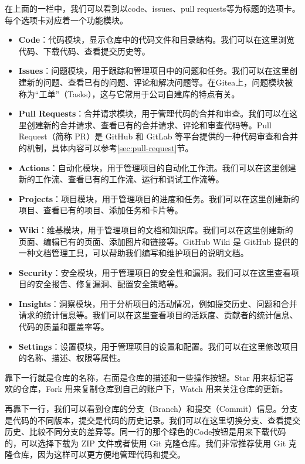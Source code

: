 \documentclass[../main.tex]{subfiles}
\begin{document}
在上面的一栏中，我们可以看到以code、issues、pull requests等为标题的选项卡。每个选项卡对应着一个功能模块。

\begin{itemize}
  \item \textbf{Code}：代码模块，显示仓库中的代码文件和目录结构。我们可以在这里浏览代码、下载代码、查看提交历史等。
  \item \textbf{Issues}：问题模块，用于跟踪和管理项目中的问题和任务。我们可以在这里创建新的问题、查看已有的问题、评论和解决问题等。在Gitea上，问题模块被称为“工单”（Tasks），这与它常用于公司自建库的特点有关。
  \item \textbf{Pull Requests}：合并请求模块，用于管理代码的合并和审查。我们可以在这里创建新的合并请求、查看已有的合并请求、评论和审查代码等。Pull Request（简称 PR）是 GitHub 和 GitLab 等平台提供的一种代码审查和合并的机制，具体内容可以参考\ref{sec:pull-request}节。
  \item \textbf{Actions}：自动化模块，用于管理项目的自动化工作流。我们可以在这里创建新的工作流、查看已有的工作流、运行和调试工作流等。
  \item \textbf{Projects}：项目模块，用于管理项目的进度和任务。我们可以在这里创建新的项目、查看已有的项目、添加任务和卡片等。
  \item \textbf{Wiki}：维基模块，用于管理项目的文档和知识库。我们可以在这里创建新的页面、编辑已有的页面、添加图片和链接等。GitHub Wiki 是 GitHub 提供的一种文档管理工具，可以帮助我们编写和维护项目的说明文档。
  \item \textbf{Security}：安全模块，用于管理项目的安全性和漏洞。我们可以在这里查看项目的安全报告、修复漏洞、配置安全策略等。
  \item \textbf{Insights}：洞察模块，用于分析项目的活动情况，例如提交历史、问题和合并请求的统计信息等。我们可以在这里查看项目的活跃度、贡献者的统计信息、代码的质量和覆盖率等。
  \item \textbf{Settings}：设置模块，用于管理项目的设置和配置。我们可以在这里修改项目的名称、描述、权限等属性。
\end{itemize}

靠下一行就是仓库的名称，右面是仓库的描述和一些操作按钮。Star 用来标记喜欢的仓库，Fork 用来复制仓库到自己的账户下，Watch 用来关注仓库的更新。

再靠下一行，我们可以看到仓库的分支（Branch）和提交（Commit）信息。分支是代码的不同版本，提交是代码的历史记录。我们可以在这里切换分支、查看提交历史、比较不同分支的差异等。同一行的那个绿色的Code按钮是用来下载代码的，可以选择下载为 ZIP 文件或者使用 Git 克隆仓库。我们非常推荐使用 Git 克隆仓库，因为这样可以更方便地管理代码和提交。
\end{document}

